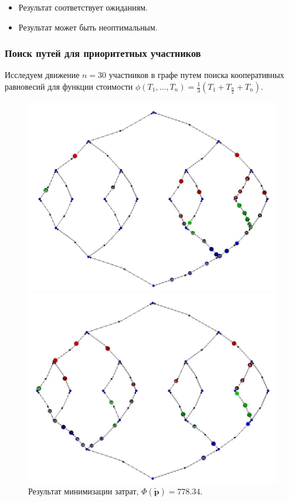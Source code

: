 \documentclass{beamer}
\begin{document}
\begin{frame}
\begin{itemize}
	\item Результат соответствует ожиданиям.
	\item Результат может быть неоптимальным.
\end{itemize}

\end{frame}


\begin{frame}\frametitle{Поиск путей для приоритетных участников}
Исследуем движение $n = 30$ участников в графе путем поиска кооперативных равновесий для функции стоимости $\phi(T_1, \ldots, T_n) = \frac{1}{3} \left(T_1 + T_{\frac{n}{2}} + T_n\right)$.
\begin{figure}[H]
	\begin{center}
		\begin{minipage}[h]{0.35\linewidth}
			\includegraphics[width=1\linewidth]{imgs/prior_good.jpg}
			\caption{Результат минимизации затрат, $\Phi(\widetilde{\textbf{p}}) = 778.34$.}
		\end{minipage}
		\hfill
		\begin{minipage}[h]{0.35\linewidth}
			\includegraphics[width=1\linewidth]{imgs/prior_bad.jpg}

\end{minipage}
\end{center}
\end{figure}
\end{frame}
\end{document}
